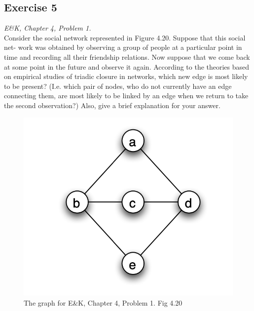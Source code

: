 \documentclass{tufte-handout}
\begin{document}
\begin{fullwidth}
\section*{\textbf{Exercise 5}}
\textit{E\&K, Chapter 4, Problem 1.}\\
Consider the social network represented in Figure 4.20. Suppose that this social net- work was obtained by observing a group of people at a particular point in time and recording all their friendship relations. Now suppose that we come back at some point in the future and observe it again. According to the theories based on empirical studies of triadic closure in networks, which new edge is most likely to be present? (I.e. which pair of nodes, who do not currently have an edge connecting them, are most likely to be linked by an edge when we return to take the second observation?) Also, give a brief explanation for your answer.
\begin{figure}[!h]
        \centering
        \includegraphics[width=.3\textwidth]{e420.png}
        \caption{The graph for E\&K, Chapter 4, Problem 1. Fig 4.20}
        \label{fig:e420}
    \end{figure}
\end{fullwidth}
\end{document}
